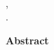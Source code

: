 \documentclass[12pt,twoside,a4paper,openright]{thesis}
\begin{document}
\pagestyle{empty}

\begin{center}
{\Large \bf \thesistitle} \\[0.75cm]

{\large \authorname, \collegename} \\[0.5cm]

{{\DPhiltext}. \DPhildate} \\[0.5cm]
\end{center}

{\large \bf Abstract} \\[0.25cm]
\abstext
\end{document}
